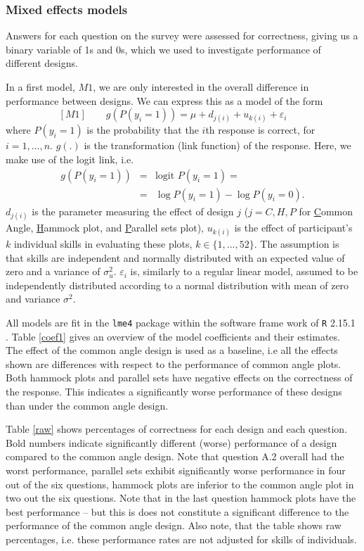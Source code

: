 \subsubsection{Mixed effects models}
Answers for each question on the survey were assessed for correctness, giving us a binary variable of 1s and 0s, which we used to investigate performance of different designs. 

In a first model, $M1$, we are only interested in the overall difference in performance between designs. We can express this as a model of the form
\begin{equation}\label{model1}[M1]
\quad\quad g(P(y_i=1)) = \mu + d_{j(i)} + u_{k(i)} + \varepsilon_i \quad\quad
\end{equation}
where $P(y_i=1)$ is the probability that the $i$th response is correct, for $i = 1, ..., n$. $g(.)$ is the transformation (link function) of the response. Here, we make use of the logit link, i.e.
\begin{eqnarray*}
g(P(y_i=1)) &=& \text{logit } P(y_i=1) = \\
&=& \log P(y_i=1) - \log P(y_i=0).
\end{eqnarray*}
$d_{j(i)}$ is the parameter measuring the effect of design $j$ ($j = C, H, P$ for \underline{C}ommon Angle, \underline{H}ammock plot, and \underline{P}arallel sets plot), $u_{k(i)}$ is the effect of participant's $k$ individual skills in evaluating these plots, $k \in \{1, ..., 52\}$. The assumption is that skills are independent and normally distributed with an expected value of zero and a variance of $\sigma_u^2$.
$\varepsilon_i$ is, similarly to a regular linear model, assumed to be independently distributed according to a normal distribution with mean of zero and variance $\sigma^2$.

All models are fit in the {\tt lme4} package \citep{lmer} within the software frame work of {\tt R} 2.15.1 \citep{R}.
Table \ref{coef1} gives an overview of the model coefficients and their estimates. The effect of the common angle design is used as a baseline, i.e all the effects shown are differences with respect to the performance of common angle plots. Both hammock plots and parallel sets  have negative effects on the correctness of the response. This indicates a significantly worse performance of these designs than under the common angle design.

Table \ref{raw} shows percentages of correctness for each design and each question. Bold numbers indicate significantly different (worse) performance of a design compared to the common angle design. Note that question A.2 overall had the worst performance, parallel sets  exhibit significantly worse performance in four out of the six questions, hammock plots are inferior to the common angle plot in two out the six questions. Note that in the last question hammock plots have the best performance -- but this is does not  constitute a significant difference to the performance of the common angle design.
Also note, that the table shows raw percentages, i.e. these performance rates are not adjusted for skills of individuals. 

